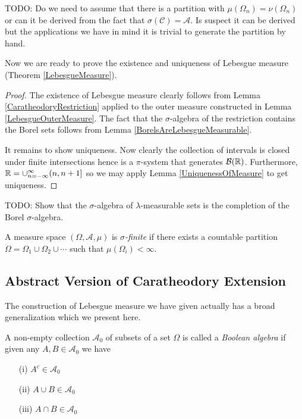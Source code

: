 TODO: Do we need to assume that there is a partition with
$\mu(\Omega_n) = \nu(\Omega_n)$ or can it be derived from the fact
that $\sigma(\mathcal{C}) = \mathcal{A}$.  Is suspect it can be
derived but the applications we have in mind it is trivial to generate
the partition by hand.

 Now we are ready to prove the existence and uniqueness of Lebesgue
measure (Theorem \ref{LebesgueMeasure}).

\begin{proof}The existence of Lebesgue measure clearly follows from
  Lemma \ref{CaratheodoryRestriction} applied to the outer measure
  constructed in Lemma \ref{LebesgueOuterMeasure}.  The fact that the
  $\sigma$-algebra of the restriction contains the Borel sets follows
  from Lemma \ref{BorelsAreLebesgueMeasurable}.

It remains to show uniqueness.  Now clearly the collection of intervals is closed under finite
intersections hence is a $\pi$-system that generates
$\mathcal{B}(\mathbb{R})$.  Furthermore, $\mathbb{R} =
\cup_{n=-\infty}^\infty (n, n+1]$ so we may apply Lemma
\ref{UniquenessOfMeasure} to get uniqueness.
\end{proof}

TODO: Show that the $\sigma$-algebra of $\lambda$-measurable sets is
the completion of the Borel $\sigma$-algebra.

\begin{defn}A measure space $(\Omega, \mathcal{A}, \mu)$ is
  \emph{$\sigma$-finite} if there exists a countable partition $\Omega
  = \Omega_1 \cup \Omega_2 \cup \cdots$ such that $\mu(\Omega_i) < \infty$.
\end{defn}

\subsection{Abstract Version of Caratheodory Extension}
The construction of Lebesgue measure we have given actually has a
broad generalization which we present here.

\begin{defn}A non-empty collection $\mathcal{A}_0$ of subsets of a set
  $\Omega$ is called a \emph{Boolean  algebra} if given any $A, B
  \in \mathcal{A}_0$ we have
\begin{itemize}
\item[(i)]$A^c \in \mathcal{A}_0$
\item[(ii)]$A \cup B \in \mathcal{A}_0$
\item[(iii)]$A \cap B \in \mathcal{A}_0$
\end{itemize}
\end{defn}

